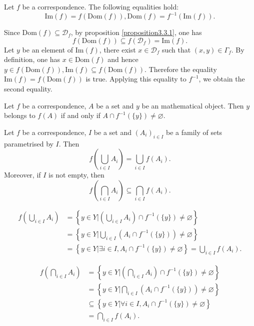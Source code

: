 \documentclass{book}
\numberwithin{equation}{section}
\begin{document}
\begin{propositionenv}\label{proposition3.3.2}
    Let $f$ be a correspondence. The following equalities hold:
    $$\mathrm{Im}(f)=f(\mathrm{Dom}(f)), \mathrm{Dom}(f)=f^{-1}(\mathrm{Im}(f)).$$
\end{propositionenv}
\begin{proofenv}
    Since $\mathrm{Dom}(f)\subseteq\mathscr{D}_f$,  by proposition \ref{proposition3.3.1},  one has 
    $$f(\mathrm{Dom}(f))\subseteq f(\mathscr{D}_f)=\mathrm{Im}(f).$$
    Let $y$ be an element of $\mathrm{Im}(f)$,  there exist $x\in \mathscr{D}_f$ such that $(x, y)\in \Gamma_f$. By definition,  one has $x\in \mathrm{Dom }(f)$ and hence $y\in f(\mathrm{Dom }(f)), \mathrm{Im}(f)\subseteq f(\mathrm{Dom }(f))$. Therefore the equality $\mathrm{Im}(f)=f(\mathrm{Dom}(f))$ is true. Applying this equality to $f^{-1}$,  we obtain the second equality.
\end{proofenv}
\begin{propositionenv}
    Let $f$ be a correspondence,  $A$ be a set and $y$ be an mathematical object. Then $y$ belongs to $f(A)$ if and only if $A\cap f^{-1}(\{y\})\not=\varnothing$.
\end{propositionenv}
\begin{propositionenv}\label{proposition3.3.4}
    Let $f$ be a correspondence,  $I$ be a set and $(A_i)_{i\in I}$ be a family of sets parametrised by $I$. Then
    $$f\left( \bigcup_{i\in I}A_i\right)=\bigcup_{i\in I}f(A_i).$$
    Moreover, if $I$ is not empty,  then 
    $$f\left( \bigcap_{i\in I}A_i\right)\subseteq \bigcap_{i\in I}f(A_i).$$

\end{propositionenv}
\begin{proofenv}
   \begin{align*}
         f\left( \bigcup_{i\in I}A_i\right)&=\left\{ y\in Y|\left( \bigcup_{i\in I}A_i\right)\cap f^{-1}(\{y\})\not=\varnothing  \right\}\\
        &=\left\{ y\in Y|\bigcup_{i\in I}\left(A_i\cap f^{-1}(\{y\})\right)\not=\varnothing  \right\}\\
        &=\left\{y\in Y|\exists i \in I, A_i\cap f^{-1}(\{y\})\not =\varnothing\right\}=\bigcup_{i\in I}f(A_i).
   \end{align*}

    \begin{align*}
        f\left(\bigcap_{i\in I}A_i \right)&=\left\{ y\in Y|\left( \bigcap_{i\in I}A_i\right) \cap f^{-1}(\{y\})\not=\varnothing\right\}\\
        &=\left\{ y\in Y| \bigcap_{i\in I}\left(A_i \cap f^{-1}(\{y\})\right)\not=\varnothing\right\}\\
        &\subseteq \left\{  y\in Y|\forall i\in I,  A_i\cap f^{-1}(\{y\})\not=\varnothing\right\}\\
        &=\bigcap_{i\in I}f(A_i).
    \end{align*}
\end{proofenv}
\end{document}
